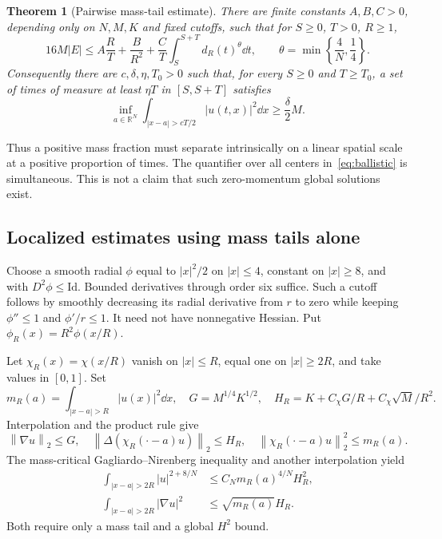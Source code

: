 \documentclass[11pt,a4paper]{article}
\newtheorem{theorem}{Theorem}[section]
\theoremstyle{remark}\newtheorem{remark}[theorem]{Remark}
\newcommand{\R}{\mathbb R}\newcommand{\C}{\mathbb C}
\newcommand{\norm}[1]{\left\|#1\right\|}
\begin{document}
\begin{theorem}[Pairwise mass-tail estimate]\label{thm:tail}
There are finite constants $A,B,C>0$, depending only on $N,M,K$ and fixed cutoffs, such that for $S\ge0$, $T>0$, $R\ge1$,
\begin{equation}\label{eq:tailestimate}
 16M|E|\le A\frac RT+\frac B{R^2}
 +\frac CT\int_S^{S+T}d_R(t)^\theta\dd t,
 \qquad \theta=\min\left\{\frac4N,\frac14\right\}.
\end{equation}
Consequently there are $c,\delta,\eta,T_0>0$ such that, for every $S\ge0$ and $T\ge T_0$, a set of times of measure at least $\eta T$ in $[S,S+T]$ satisfies
\begin{equation}\label{eq:ballistic}
 \inf_{a\in\R^N}\int_{|x-a|>cT/2}|u(t,x)|^2\dd x
 \ge\frac\delta2 M.
\end{equation}
\end{theorem}

Thus a positive mass fraction must separate intrinsically on a linear spatial scale at a positive proportion of times. The quantifier over all centers in~\eqref{eq:ballistic} is simultaneous. This is not a claim that such zero-momentum global solutions exist.

\subsection{Localized estimates using mass tails alone}
Choose a smooth radial $\phi$ equal to $|x|^2/2$ on $|x|\le4$, constant on $|x|\ge8$, and with $D^2\phi\le\mathrm{Id}$. Bounded derivatives through order six suffice. Such a cutoff follows by smoothly decreasing its radial derivative from $r$ to zero while keeping $\phi''\le1$ and $\phi'/r\le1$. It need not have nonnegative Hessian. Put $\phi_R(x)=R^2\phi(x/R)$.

Let $\chi_R(x)=\chi(x/R)$ vanish on $|x|\le R$, equal one on $|x|\ge2R$, and take values in $[0,1]$. Set
\[
 m_R(a)=\int_{|x-a|>R}|u(x)|^2\dd x,\quad
 G=M^{1/4}K^{1/2},\quad H_R=K+C_\chi G/R+C_\chi\sqrt M/R^2.
\]
Interpolation and the product rule give
\[
 \norm{\nabla u}_2\le G,\quad
 \norm{\Delta(\chi_R(\cdot-a)u)}_2\le H_R,\quad
 \norm{\chi_R(\cdot-a)u}_2^2\le m_R(a).
\]
The mass-critical Gagliardo--Nirenberg inequality and another interpolation yield
\begin{align}
 \int_{|x-a|>2R}|u|^{2+8/N}&\le C_Nm_R(a)^{4/N}H_R^2,\label{eq:tailGN}\\
 \int_{|x-a|>2R}|\nabla u|^2&\le\sqrt{m_R(a)}H_R.\label{eq:tailgrad}
\end{align}
Both require only a mass tail and a global $H^2$ bound.
\end{document}
